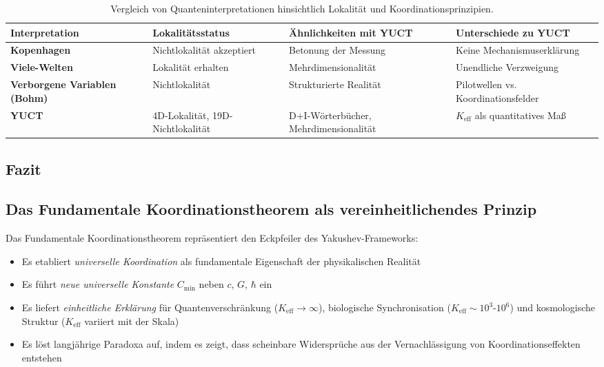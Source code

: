 \documentclass[11pt,a4paper]{article}
\begin{document}
	\begin{table}[htbp]
		\centering
		\begin{tabular}{p{}p{}p{}p{}}
			\toprule
			\textbf{Interpretation} & \textbf{Lokalitätsstatus} & \textbf{Ähnlichkeiten mit YUCT} & \textbf{Unterschiede zu YUCT} \\
			\midrule
			\textbf{Kopenhagen} & Nichtlokalität akzeptiert & Betonung der Messung & Keine Mechanismuserklärung \\
			\textbf{Viele-Welten} & Lokalität erhalten & Mehrdimensionalität & Unendliche Verzweigung \\
			\textbf{Verborgene Variablen (Bohm)} & Nichtlokalität & Strukturierte Realität & Pilotwellen vs. Koordinationsfelder \\
			\textbf{YUCT} & 4D-Lokalität, 19D-Nichtlokalität & D+I-Wörterbücher, Mehrdimensionalität & $K_{\mathrm{eff}}$ als quantitatives Maß \\
			\bottomrule
		\end{tabular}
		\caption{Vergleich von Quanteninterpretationen hinsichtlich Lokalität und Koordinationsprinzipien.}
		\label{tab:interpretations}
	\end{table}
	
	\subsection{Fazit}
	\label{subsec:epr-conclusion}
	\subsection{Das Fundamentale Koordinationstheorem als vereinheitlichendes Prinzip}
	
	Das Fundamentale Koordinationstheorem repräsentiert den Eckpfeiler des Yakushev-Frameworks:
	\begin{itemize}
		\item Es etabliert \emph{universelle Koordination} als fundamentale Eigenschaft der physikalischen Realität
		\item Es führt \emph{neue universelle Konstante} $C_{\min}$ neben $c$, $G$, $\hbar$ ein
		\item Es liefert \emph{einheitliche Erklärung} für Quantenverschränkung ($K_{\mathrm{eff}} \to \infty$), biologische Synchronisation ($K_{\mathrm{eff}} \sim 10^3$-$10^6$) und kosmologische Struktur ($K_{\mathrm{eff}}$ variiert mit der Skala)
		\item Es löst langjährige Paradoxa auf, indem es zeigt, dass scheinbare Widersprüche aus der Vernachlässigung von Koordinationseffekten entstehen
	\end{itemize}
	
\end{document}
